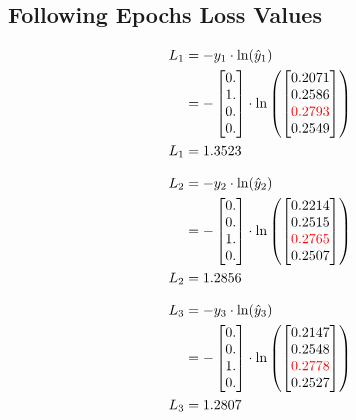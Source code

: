 \documentclass{article}
\begin{document}
\subsection{Following Epochs Loss Values}

\begin{align*}
    L_1 &= -y_1 \cdot \ln(\hat{y}_1) \\
    &= -\begin{bmatrix} 0. \\ 1. \\ 0. \\ 0. \end{bmatrix} \cdot \ln\left(
\begin{bmatrix}
0.2071 \\
0.2586 \\
\textcolor{red}{0.2793} \\
0.2549
\end{bmatrix}\right) \\
    L_1 &= 1.3523
\end{align*}

\begin{align*}
    L_2 &= -y_2 \cdot \ln(\hat{y}_2) \\
    &= -\begin{bmatrix} 0. \\ 0. \\ 1. \\ 0. \end{bmatrix} \cdot \ln\left(\begin{bmatrix}
0.2214 \\
0.2515 \\
\textcolor{red}{0.2765} \\
0.2507
\end{bmatrix}\right) \\
    L_2 &= 1.2856
\end{align*}

\begin{align*}
    L_3 &= -y_3 \cdot \ln(\hat{y}_3) \\
    &= -\begin{bmatrix} 0. \\ 0. \\ 1. \\ 0. \end{bmatrix} \cdot \ln\left(\begin{bmatrix}
0.2147 \\
0.2548 \\
\textcolor{red}{0.2778} \\
0.2527
\end{bmatrix}\right) \\
    L_3 &= 1.2807
\end{align*}
\end{document}
